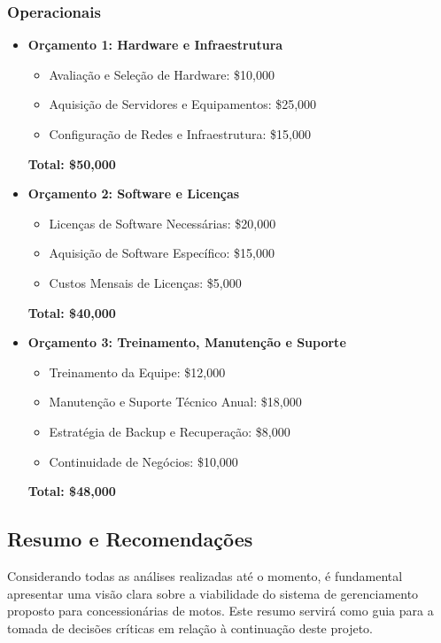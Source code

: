 	\subsubsection{Operacionais}
	\begin{itemize}
		\item \textbf{Orçamento 1: Hardware e Infraestrutura}
		\begin{itemize}
			\item Avaliação e Seleção de Hardware: \$10,000
			\item Aquisição de Servidores e Equipamentos: \$25,000
			\item Configuração de Redes e Infraestrutura: \$15,000
		\end{itemize}
		
		\textbf{Total: \$50,000}
		
		\item \textbf{Orçamento 2: Software e Licenças}
		\begin{itemize}
			\item Licenças de Software Necessárias: \$20,000
			\item Aquisição de Software Específico: \$15,000
			\item Custos Mensais de Licenças: \$5,000
		\end{itemize}
		
		\textbf{Total: \$40,000}
		
		\item \textbf{Orçamento 3: Treinamento, Manutenção e Suporte}
		\begin{itemize}
			\item Treinamento da Equipe: \$12,000
			\item Manutenção e Suporte Técnico Anual: \$18,000
			\item Estratégia de Backup e Recuperação: \$8,000
			\item Continuidade de Negócios: \$10,000
		\end{itemize}
		
		\textbf{Total: \$48,000}
	\end{itemize}
	

       \subsection{Resumo e Recomenda\c{c}\~{o}es}

       Considerando todas as análises realizadas até o momento, é fundamental apresentar uma visão clara sobre a viabilidade do sistema de gerenciamento proposto para concessionárias de motos. Este resumo servirá como guia para a tomada de decisões críticas em relação à continuação deste projeto.
       
